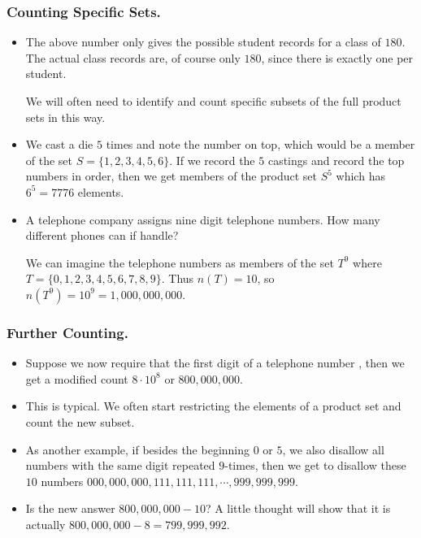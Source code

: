 \begin{frame}%
  \frametitle{Counting Specific Sets.}
  \begin{itemize}%
\item The above number only gives the possible student records for a
class of $180$. The actual class records are, of course only $180$,
since there is exactly one per student.

We will often need to identify and count specific subsets of the full
product sets in this way.

\item We cast a die $5$ times and note the number on top, which would be
a member of the set $S=\{1,2,3,4,5,6\}$. If we record the $5$ castings
and record the top numbers in order, then we get members of the product
set $S^5$ which has $6^5=7776$ elements.

\item A telephone company assigns nine digit telephone numbers. How many
different phones can if handle?

We can imagine the telephone numbers as members of the set $T^9$ where
$T=\{0,1,2,3,4,5,6,7,8,9\}$. Thus $n(T)=10$, so $n(T^9)=10^9 =
1,000,000,000$.



\end{itemize}
\end{frame}

%


\begin{frame}%
  \frametitle{Further Counting.}
  \begin{itemize}%
 
\item Suppose we now require that the first digit of a telephone number
, then we get a modified count $8\cdot 10^8$ or
$800,000,000$.

\item This is typical. We often start restricting the elements of a
product set and count the new subset.

\item As another example, if besides the beginning $0$ or $5$, we also
disallow all numbers with the same digit repeated $9$-times, then we get
to disallow these $10$ numbers $000,000,000,
111,111,111,\cdots , 999,999,999$.

\item Is the new answer $800,000,000 -10$?
A little thought will show that it is actually
$800,000,000 -8 = 799,999,992$.

\end{itemize}
\end{frame}

